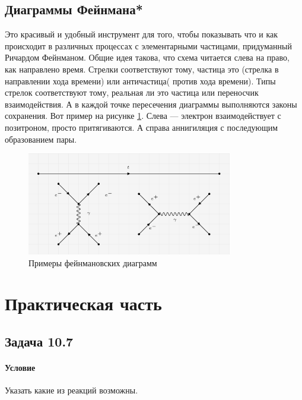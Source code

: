 \documentclass[12pt]{article}
\begin{document}
\subsection*{Диаграммы Фейнмана*}
Это красивый и удобный инструмент для того, чтобы показывать что и как происходит в различных процессах с элементарными частицами, придуманный Ричардом Фейнманом. Общие идея такова, что схема читается слева на право, как направлено время. Стрелки соответствуют тому, частица это (стрелка в направлении хода времени) или античастица( против хода времени). Типы стрелок соответствуют тому, реальная ли это частица или переносчик взаимодействия. А в каждой точке пересечения диаграммы выполняются законы сохранения. Вот пример на рисунке \ref{fig:sem_11_fey}. Слева --- электрон взаимодействует с позитроном, просто притягиваются. А справа аннигиляция с последующим образованием пары.
\begin{figure}[h]
    \centering
    \includegraphics[width=0.8\textwidth,height=\textheight,keepaspectratio]{Seminar_11/pics/pic_05_fey.PNG}
    \caption{Примеры фейнмановских диаграмм}
    \label{fig:sem_11_fey}
\end{figure}

\section{Практическая часть}
\subsection{Задача 10.7}
\label{task_}
\paragraph{Условие}
Указать какие из реакций возможны.
\end{document}

